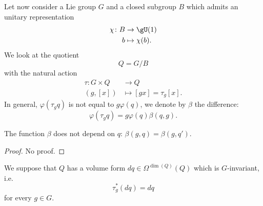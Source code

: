 Let now consider a Lie group $G$ and a closed subgroup $B$ which admits an unitary representation
\begin{equation}
	\begin{aligned}
		\chi\colon B & \to \gU(1)       \\
		b            & \mapsto \chi(b).
	\end{aligned}
\end{equation}
We look at the quotient
\begin{equation}
	Q=G/B
\end{equation}
with the natural action
\begin{equation}
	\begin{aligned}
		\tau\colon G\times Q & \to Q                   \\
		(g,[x])              & \mapsto [gx]=\tau_g[x].
	\end{aligned}
\end{equation}
In general, $\varphi(\tau_gq)$ is not equal to $g\varphi(q)$, we denote by $\beta$ the difference:
\begin{equation}			\label{EqDefBetavptaunotEqual}
	\varphi(\tau_g q)=g\varphi(q)\beta(q,g).
\end{equation}
\begin{lemma}
	The function $\beta$ does not depend on $q$: $\beta(g,q)=\beta(g,q')$.
\end{lemma}
\begin{proof}
	No proof.
\end{proof}

We suppose that $Q$ has a volume form $dq\in\Omega^{\dim(Q)}(Q)$ which is $G$-invariant, i.e.
\begin{equation}
	\tau^*_g(dq)=dq
\end{equation}
for every $g\in G$.


